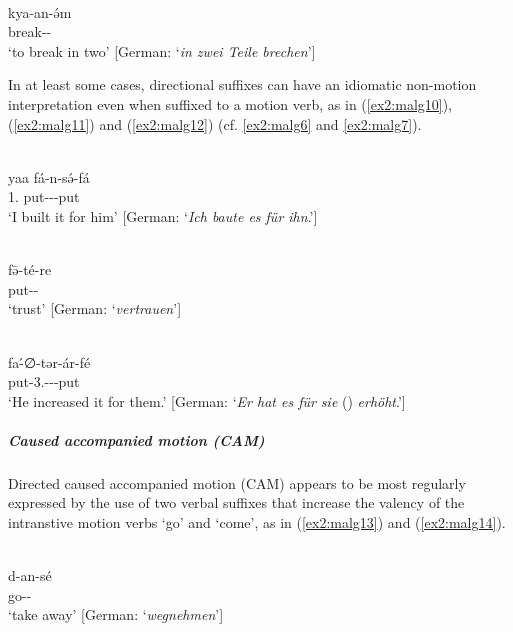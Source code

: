 \ea\label{ex2:malg18}
 \\
\gll kya-an-ə́m	\\
break--	\\
\glt `to break in two' [German: `\textit{in zwei Teile brechen}']
\z

In at least some cases, directional suffixes can have an idiomatic non-motion interpretation even when suffixed to a motion verb, as in (\ref{ex2:malg10}), (\ref{ex2:malg11}) and (\ref{ex2:malg12}) (cf. \ref{ex2:malg6} and \ref{ex2:malg7}).

\ea\label{ex2:malg10}
 \\
\gll yaa fá-n-sə́-fá \\
1. put---put \\
\glt `I built it for him' [German: `\textit{Ich baute es für ihn}.']

\ex\label{ex2:malg11}
 \\
\gll fə̄-té-re \\
put--	\\
\glt `trust' [German: `\textit{vertrauen}']

\ex\label{ex2:malg12}
 \\
\gll fa-́∅-tər-ár-fé \\
put-3.---put \\
\glt `He increased it for them.' [German: `\textit{Er hat es für sie} () \textit{erhöht}.']
\z 

\subparagraph{Caused accompanied motion (CAM)}

Directed caused accompanied motion (CAM) appears to be most regularly expressed by the use of two verbal suffixes that increase the valency of the intranstive motion verbs `go' and `come', as in (\ref{ex2:malg13}) and (\ref{ex2:malg14}). 

\ea\label{ex2:malg13}
 \\
\gll d-an-sé \\
go-- \\
\glt `take away' [German: `\textit{wegnehmen}']

